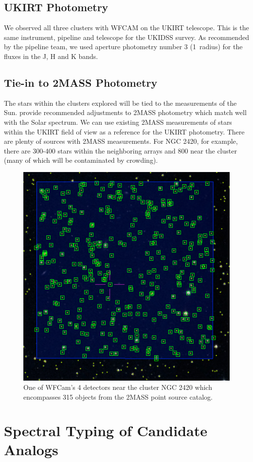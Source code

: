 \documentclass{aastex6}
\begin{document}
\subsection{UKIRT Photometry}

We observed all three clusters with WFCAM on the UKIRT telescope.
This is the same instrument, pipeline and telescope for the UKIDSS survey.
As recommended by the pipeline team, we used aperture photometry number 3 (1\arcsec\ radius) for the fluxes in the J, H and K bands.

\subsection{Tie-in to 2MASS Photometry}

The stars within the clusters explored will be tied to the measurements of the Sun.
\citet{rieke2008absIRcal} provide recommended adjustments to 2MASS photometry which match well with the Solar spectrum.
We can use existing 2MASS measurements of stars within the UKIRT field of view as a reference for the UKIRT photometry.
There are plenty of sources with 2MASS measurements.
For NGC 2420, for example, there are 300-400 stars within the neighboring arrays and 800 near the cluster (many of which will be contaminated by crowding).

\begin{figure}[!hbtp]
\centering
\includegraphics[width=.4\columnwidth]{aladin_ngc2420_wfcam_square.png}
\caption{One of WFCam's 4 detectors near the cluster NGC 2420 which encompasses 315 objects from the 2MASS point source catalog.}\label{fig:wfcam3}
\end{figure}

\clearpage
\section{Spectral Typing of Candidate Analogs}
\end{document}
